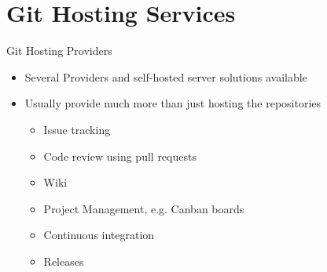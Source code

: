 \section{Git Hosting Services}

\begin{frame}[t]{Git Hosting Providers}
  \begin{itemize}
    \item Several Providers and self-hosted server solutions available
    \item Usually provide much more than just hosting the repositories
      \begin{itemize}
        \item Issue tracking
        \item Code review using pull requests
        \item Wiki
        \item Project Management, e.g. Canban boards
        \item Continuous integration
        \item Releases
      \end{itemize}
  \end{itemize}
  
\end{frame}

